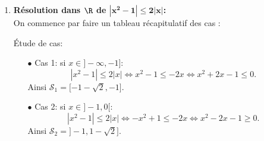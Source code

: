 \begin{correction}
\begin{enumerate}
\item \textbf{R\'esolution dans $\mathbf{\R}$ de $\mathbf{|x^2-1|\leq 2|x|}$:}\\
On commence par faire un tableau r\'ecapitulatif des cas :
\begin{center}
\end{center}
\'Etude de cas:
\begin{itemize}
\item[$\bullet$] Cas 1: si $x\in\rbrack -\infty,-1\rbrack:$
$$|x^2-1|\leq 2|x| \Leftrightarrow x^2-1\leq -2x  \Leftrightarrow x^2+2x-1\leq 0 .$$
Ainsi $\mathcal{S}_1=\lbrack -1-\sqrt{2},-1\rbrack$.
\item[$\bullet$] Cas 2: si $x\in\rbrack -1,0\lbrack$:
$$|x^2-1|\leq 2|x| \Leftrightarrow -x^2+1\leq -2x  \Leftrightarrow x^2-2x-1\geq 0.$$
Ainsi $\mathcal{S}_2=\rbrack -1,1-\sqrt{2}\rbrack$.


\end{itemize}
\end{enumerate}
\end{correction}
